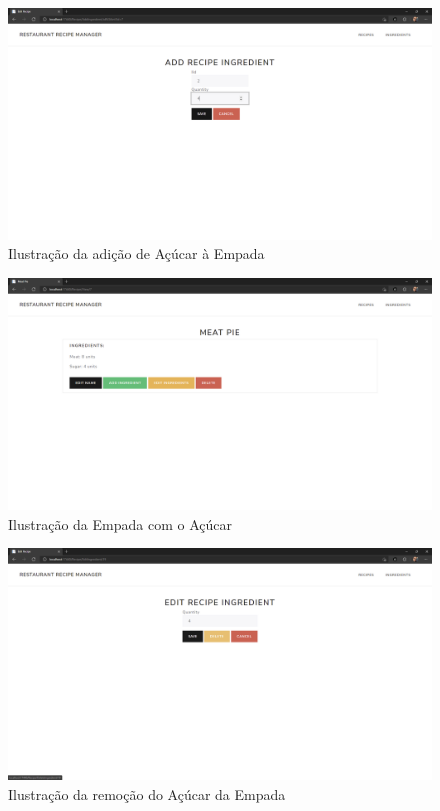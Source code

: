 \FloatBarrier
\begin{figure}[!hbt]
    \centering
    \includegraphics[width=14cm]{Resources/WebApp/Recipes/recipe (16).png}
    \caption{Ilustração da adição de Açúcar à Empada}
    \label{fig:app_rec_16}
\end{figure}
\FloatBarrier
\begin{figure}[!hbt]
    \centering
    \includegraphics[width=14cm]{Resources/WebApp/Recipes/recipe (17).png}
    \caption{Ilustração da Empada com o Açúcar}
    \label{fig:app_rec_17}
\end{figure}
\FloatBarrier
\begin{figure}[!hbt]
    \centering
    \includegraphics[width=14cm]{Resources/WebApp/Recipes/recipe (18).png}
    \caption{Ilustração da remoção do Açúcar da Empada}
    \label{fig:app_rec_18}
\end{figure}
